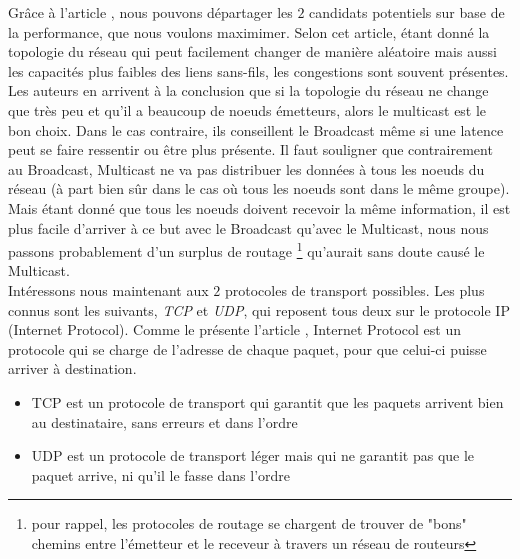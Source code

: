 \documentclass[journal, a4paper]{IEEEtran}
\begin{document}
        Grâce à l'article \cite{NikolaidisIoanis2004AMaW}, nous pouvons départager les $2$ candidats potentiels sur base de la performance, que nous voulons maximimer. Selon cet article, 
        étant donné la topologie du réseau qui peut facilement changer de manière aléatoire mais aussi les capacités plus faibles des liens sans-fils, les congestions sont souvent présentes.
        Les auteurs en arrivent à la conclusion que si la topologie du réseau ne change que très peu et qu'il a beaucoup de noeuds émetteurs, alors le multicast est le bon choix. Dans le cas contraire, ils 
        conseillent le Broadcast même si une latence peut se faire ressentir ou être plus présente.
        Il faut souligner que contrairement au Broadcast, Multicast ne va pas distribuer les données à tous les noeuds du réseau (à part bien sûr dans le cas où tous les noeuds sont dans le même groupe).
        Mais étant donné que tous les noeuds doivent recevoir la même information, il est plus facile d'arriver à ce but avec le Broadcast qu'avec le Multicast, nous nous passons 
        probablement d'un surplus de routage \footnote{pour rappel, les protocoles de routage se chargent de trouver de "bons" chemins entre l'émetteur et le receveur à travers un réseau de routeurs}
        qu'aurait sans doute causé le Multicast. \\

        Intéressons nous maintenant aux $2$ protocoles de transport possibles. Les plus connus sont les suivants, \textit{TCP} et \textit{UDP}, qui reposent tous deux sur le protocole IP (Internet Protocol).
        Comme le présente l'article \cite{nath2015tcp}, Internet Protocol est un protocole qui se charge de l'adresse de chaque paquet, pour que celui-ci puisse arriver à destination. 
        \begin{itemize}
                \item TCP est un protocole de transport qui garantit que les paquets arrivent bien au destinataire, sans erreurs et dans l'ordre
                \item UDP est un protocole de transport léger mais qui ne garantit pas que le paquet arrive, ni qu'il le fasse dans l'ordre \\
        \end{itemize}
\end{document}
